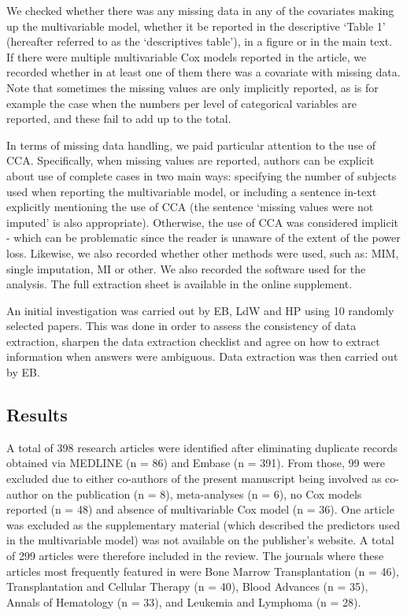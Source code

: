 \documentclass[
  letterpaper,
  paper=240mm:170mm,
  twoside=true,
  open=right,
  fontsize=10pt,
  pagesize=false,
  BCOR=15mm,
  DIV=14,
  headinclude=true,
  footinclude=false,
  headsepline=on]{scrbook}
\begin{document}
We checked whether there was any missing data in any of the covariates
making up the multivariable model, whether it be reported in the
descriptive `Table 1' (hereafter referred to as the `descriptives
table'), in a figure or in the main text. If there were multiple
multivariable Cox models reported in the article, we recorded whether in
at least one of them there was a covariate with missing data. Note that
sometimes the missing values are only implicitly reported, as is for
example the case when the numbers per level of categorical variables are
reported, and these fail to add up to the total.

In terms of missing data handling, we paid particular attention to the
use of CCA. Specifically, when missing values are reported, authors can
be explicit about use of complete cases in two main ways: specifying the
number of subjects used when reporting the multivariable model, or
including a sentence in-text explicitly mentioning the use of CCA (the
sentence `missing values were not imputed' is also appropriate).
Otherwise, the use of CCA was considered implicit - which can be
problematic since the reader is unaware of the extent of the power loss.
Likewise, we also recorded whether other methods were used, such as:
MIM, single imputation, MI or other. We also recorded the software used
for the analysis. The full extraction sheet is available in the online
supplement.

An initial investigation was carried out by EB, LdW and HP using 10
randomly selected papers. This was done in order to assess the
consistency of data extraction, sharpen the data extraction checklist
and agree on how to extract information when answers were ambiguous.
Data extraction was then carried out by EB.

\subsection{Results}\label{results}

A total of 398 research articles were identified after eliminating
duplicate records obtained via MEDLINE (n = 86) and Embase (n = 391).
From those, 99 were excluded due to either co-authors of the present
manuscript being involved as co-author on the publication (n = 8),
meta-analyses (n = 6), no Cox models reported (n = 48) and absence of
multivariable Cox model (n = 36). One article was excluded as the
supplementary material (which described the predictors used in the
multivariable model) was not available on the publisher's website. A
total of 299 articles were therefore included in the review. The
journals where these articles most frequently featured in were Bone
Marrow Transplantation (n = 46), Transplantation and Cellular Therapy (n
= 40), Blood Advances (n = 35), Annals of Hematology (n = 33), and
Leukemia and Lymphoma (n = 28).
\end{document}
